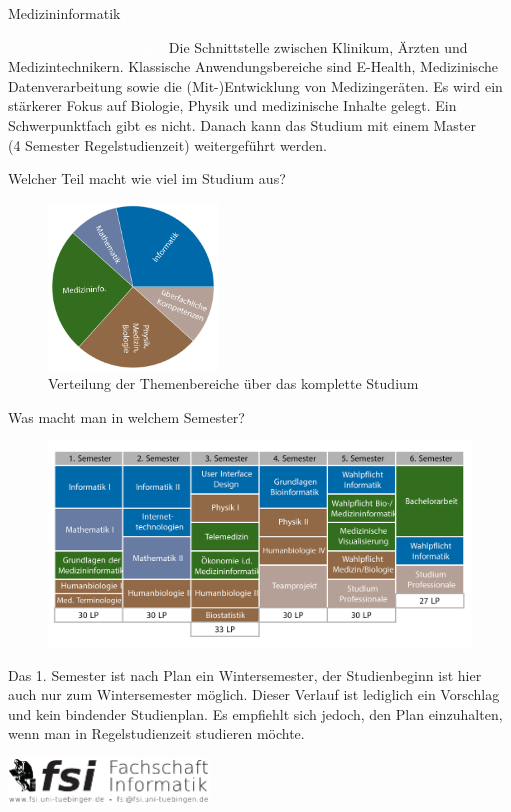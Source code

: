 	\begin{Huge}
			Medizininformatik
		\end{Huge}
		\begin{exampleblock}{\textcolor{white}{Was ist der Studiengang?}}
			Die Schnittstelle zwischen Klinikum, Ärzten und Medizintechnikern. Klassische Anwendungsbereiche sind E-Health, Medizinische Datenverarbeitung sowie die (Mit-)Entwicklung von Medizingeräten. Es wird ein stärkerer Fokus auf Biologie, Physik und medizinische Inhalte gelegt. Ein Schwerpunktfach gibt es nicht. Danach kann das Studium mit einem Master \\ (4 Semester Regelstudienzeit) weitergeführt werden.
		\end{exampleblock}
	\begin{block}{Welcher Teil macht wie viel im Studium aus?}
		\begin{figure}[h!]
			\includegraphics[width=0.4\textwidth]{charts/medizininformatik-Piechart.pdf}
			\caption{Verteilung der Themenbereiche über das komplette Studium}
		\end{figure}
	\end{block}
	\begin{block}{Was macht man in welchem Semester?}
		\begin{figure}[h!]
			\includegraphics[width=\textwidth]{charts/medizininformatik_Studienplan_abWS18.pdf}
		\end{figure}
		Das 1. Semester ist nach Plan ein Wintersemester, der Studienbeginn ist hier auch nur zum Wintersemester möglich. 
		Dieser Verlauf ist lediglich ein Vorschlag und kein bindender Studienplan. Es empfiehlt sich jedoch, den Plan einzuhalten, wenn man in Regelstudienzeit studieren möchte.
	\end{block}
\vfill
\begin{flushright}
	\includegraphics[width=0.4\textwidth]{fsilogo.pdf}
\end{flushright}